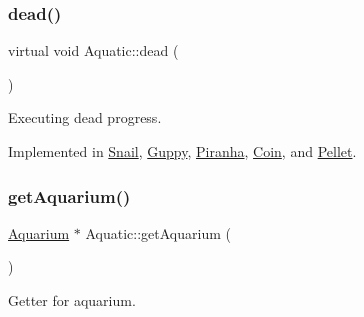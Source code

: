 \subsubsection{\texorpdfstring{dead()}{dead()}}
{\footnotesize\ttfamily virtual void Aquatic\+::dead (\begin{DoxyParamCaption}{ }\end{DoxyParamCaption})\hspace{0.3cm}{\ttfamily [pure virtual]}}



Executing dead progress. 



Implemented in \mbox{\hyperlink{class_snail_ae80c3d27739aefd6d9c9078c4d17fcc3}{Snail}}, \mbox{\hyperlink{class_guppy_abcdcd74d4c3fdddfc5cc0439c0e512b7}{Guppy}}, \mbox{\hyperlink{class_piranha_a1f30b46fb909558c44eba327e99d5f2e}{Piranha}}, \mbox{\hyperlink{class_coin_af0c650f68a63698691c574fbef940776}{Coin}}, and \mbox{\hyperlink{class_pellet_a50bfc2589da43b06640bc5504e3c689b}{Pellet}}.

\mbox{\label{class_aquatic_aa84812ff8347a11345b9c8231c1375cc}} 
\subsubsection{\texorpdfstring{get\+Aquarium()}{getAquarium()}}
{\footnotesize\ttfamily \mbox{\hyperlink{class_aquarium}{Aquarium}} $\ast$ Aquatic\+::get\+Aquarium (\begin{DoxyParamCaption}{ }\end{DoxyParamCaption})}



Getter for aquarium. 

